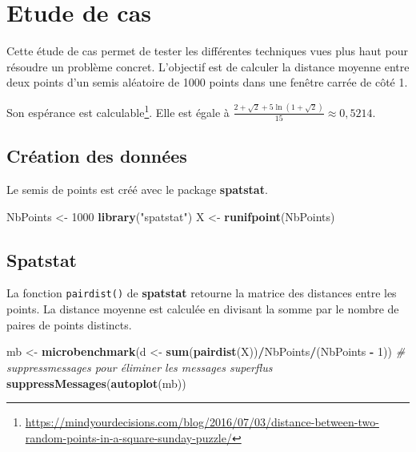 \documentclass[
  12pt,
  french,
  a4paper,
  extrafontsizes,onecolumn,openright
  ]{memoir}
\newenvironment{Shaded}{\begin{snugshade}}{\end{snugshade}}
\newcommand{\CommentTok}[1]{\textcolor[rgb]{0.56,0.35,0.01}{\textit{#1}}}
\newcommand{\DecValTok}[1]{\textcolor[rgb]{0.00,0.00,0.81}{#1}}
\newcommand{\KeywordTok}[1]{\textcolor[rgb]{0.13,0.29,0.53}{\textbf{#1}}}
\newcommand{\NormalTok}[1]{#1}
\newcommand{\OperatorTok}[1]{\textcolor[rgb]{0.81,0.36,0.00}{\textbf{#1}}}
\newcommand{\StringTok}[1]{\textcolor[rgb]{0.31,0.60,0.02}{#1}}
\newlength{\rf}
\begin{document}
\hypertarget{sec:cas}{%
\section{Etude de cas}\label{sec:cas}}

Cette étude de cas permet de tester les différentes techniques vues plus haut pour résoudre un problème concret.
L'objectif est de calculer la distance moyenne entre deux points d'un semis aléatoire de 1000 points dans une fenêtre carrée de côté 1.

Son espérance est calculable\footnote{\url{https://mindyourdecisions.com/blog/2016/07/03/distance-between-two-random-points-in-a-square-sunday-puzzle/}}.
Elle est égale à \(\frac{2+\sqrt{2}+5\ln{(1+\sqrt{2})}}{15} \approx 0,5214\).

\hypertarget{cruxe9ation-des-donnuxe9es}{%
\subsection{Création des données}\label{cruxe9ation-des-donnuxe9es}}

Le semis de points est créé avec le package \textbf{spatstat}.

\scriptsize

\begin{Shaded}
\begin{Highlighting}[]
\NormalTok{NbPoints <-}\StringTok{ }\DecValTok{1000}
\KeywordTok{library}\NormalTok{(}\StringTok{"spatstat"}\NormalTok{)}
\NormalTok{X <-}\StringTok{ }\KeywordTok{runifpoint}\NormalTok{(NbPoints)}
\end{Highlighting}
\end{Shaded}

\normalsize

\hypertarget{spatstat}{%
\subsection{Spatstat}\label{spatstat}}

La fonction \texttt{pairdist()} de \textbf{spatstat} retourne la matrice des distances entre les points.
La distance moyenne est calculée en divisant la somme par le nombre de paires de points distincts.

\scriptsize

\begin{Shaded}
\begin{Highlighting}[]
\NormalTok{mb <-}\StringTok{ }\KeywordTok{microbenchmark}\NormalTok{(d <-}\StringTok{ }\KeywordTok{sum}\NormalTok{(}\KeywordTok{pairdist}\NormalTok{(X))}\OperatorTok{/}\NormalTok{NbPoints}\OperatorTok{/}\NormalTok{(NbPoints }\OperatorTok{-}\StringTok{ }
\StringTok{    }\DecValTok{1}\NormalTok{))}
\CommentTok{# suppressmessages pour éliminer les messages superflus}
\KeywordTok{suppressMessages}\NormalTok{(}\KeywordTok{autoplot}\NormalTok{(mb))}
\end{Highlighting}
\end{Shaded}
\end{document}
